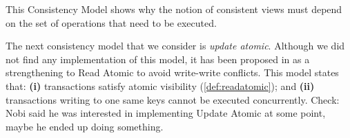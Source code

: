 \ac{This Consistency Model shows why the notion of consistent views must 
depend on the set of operations that need to be executed.}

The next consistency model that we consider is \emph{update atomic}. 
Although we did not find any implementation of this model, it has been proposed in \cite{framework-concur} as a strengthening to Read Atomic to avoid write-write conflicts.
This model states that: \textbf{(i)} transactions satisfy atomic visibility (\cref{def:readatomic}); and \textbf{(ii)} transactions writing to one same keys cannot be executed concurrently.
\ac{Check: Nobi said he was interested in implementing Update Atomic 
at some point, maybe he ended up doing something.}

